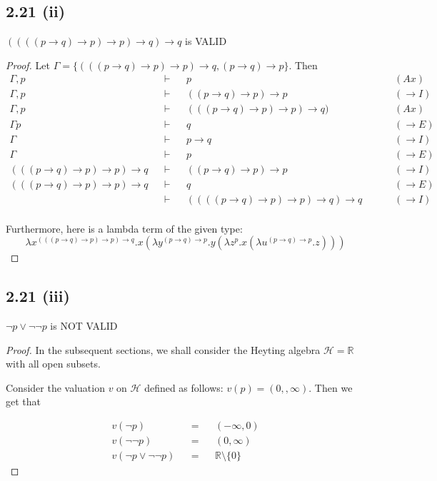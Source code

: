 \documentclass[12pt]{article}
\begin{document}
\subsection*{2.21 (ii)} 
$((((p \rightarrow q) \rightarrow p) \rightarrow p) \rightarrow q) \rightarrow q$ is VALID
\begin{proof}
Let $\Gamma = \{(((p \rightarrow q) \rightarrow p) \rightarrow p) \rightarrow q, (p \rightarrow q) \rightarrow p\}$. Then 
\begin{align*}
    \Gamma, p &&\vdash&& p && &&(Ax)\\
    \Gamma, p &&\vdash&& ((p \rightarrow q) \rightarrow p) \rightarrow p && &&(\rightarrow I)\\
    \Gamma, p &&\vdash&& (((p \rightarrow q) \rightarrow p) \rightarrow p) \rightarrow q) && &&(Ax)\\
    \Gamma p &&\vdash&& q && &&(\rightarrow E) \\
    \Gamma &&\vdash&& p \rightarrow q && &&(\rightarrow I) \\
    \Gamma &&\vdash&& p && &&(\rightarrow E) \\
    (((p \rightarrow q) \rightarrow p) \rightarrow p) \rightarrow q &&\vdash&& ((p \rightarrow q) \rightarrow p) \rightarrow p && &&(\rightarrow I) \\
    (((p \rightarrow q) \rightarrow p) \rightarrow p) \rightarrow q &&\vdash&& q && &&(\rightarrow E) \\
    &&\vdash&& ((((p \rightarrow q) \rightarrow p) \rightarrow p) \rightarrow q) \rightarrow q && &&(\rightarrow I) \\
\end{align*}

Furthermore, here is a lambda term of the given type: $$\lambda x^{(((p \rightarrow q) \rightarrow p) \rightarrow p) \rightarrow q}. x(\lambda y^{(p \rightarrow q) \rightarrow p}. y(\lambda z^{p}. x(\lambda u^{(p \rightarrow q) \rightarrow p}. z)))$$
\end{proof}

\subsection*{2.21 (iii)} 
$\neg p \vee \neg \neg p$ is NOT VALID

\begin{proof}
In the subsequent sections, we shall consider the Heyting algebra $\mathcal{H} = \mathbb{R}$ with all open subsets. 

Consider the valuation $v$ on $\mathcal{H}$ defined as follows: $v(p) = (0,,\infty)$. Then we get that 

\begin{align*}
    v(\neg p) &&=&& (-\infty, 0) \\
    v(\neg \neg p) &&=&& (0, \infty) \\
    v(\neg p \vee \neg \neg p) &&=&& \mathbb{R} \setminus \{0\}
\end{align*}

\end{proof}
\end{document}
